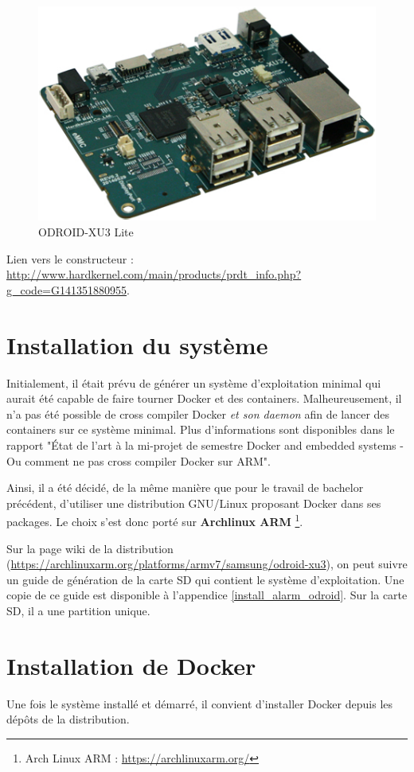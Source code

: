 \documentclass[11pt,a4paper,oneside]{report}
\newcommand{\oldreportname}{État de l’art à la mi-projet de semestre Docker and embedded systems - Ou comment ne pas cross compiler Docker sur ARM}
\newcommand{\odroid}{ODROID-XU3 Lite }
\begin{document}
\begin{figure}[hbtp]
\centering
\includegraphics[scale=0.5]{img/ODROIDXU3Lite.jpg}
\caption{\odroid}
\end{figure}

Lien vers le constructeur : \url{http://www.hardkernel.com/main/products/prdt_info.php?g_code=G141351880955}.

\section{Installation du système}

Initialement, il était prévu de générer un système d'exploitation minimal qui aurait été capable de faire tourner Docker et des containers. Malheureusement, il n'a pas été possible de cross compiler Docker \textit{et son daemon} afin de lancer des containers sur ce système minimal. Plus d'informations sont disponibles dans le rapport "\oldreportname".

Ainsi, il a été décidé, de la même manière que pour le travail de bachelor précédent, d'utiliser une distribution GNU/Linux proposant Docker dans ses packages. Le choix s'est donc porté sur \textbf{Archlinux ARM} \footnote{Arch Linux ARM : \url{https://archlinuxarm.org/}}.

Sur la page wiki de la distribution (\url{https://archlinuxarm.org/platforms/armv7/samsung/odroid-xu3}), on peut suivre un guide de génération de la carte SD qui contient le système d'exploitation. Une copie de ce guide est disponible à l'appendice \ref{install_alarm_odroid}. Sur la carte SD, il a une partition unique.


\section{Installation de Docker}
Une fois le système installé et démarré, il convient d'installer Docker depuis les dépôts de la distribution.
\end{document}
